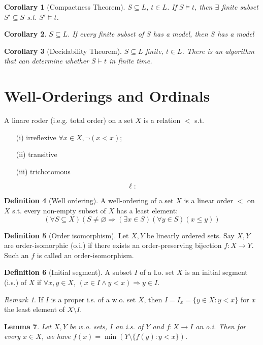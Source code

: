 \documentclass{article}
\theoremstyle{definition}
\newtheorem{defn}{Definition}[section]
\theoremstyle{remark}
\newtheorem{rem}{Remark}
\theoremstyle{plain}
\newtheorem{lem}[defn]{Lemma}
\newtheorem{crly}[defn]{Corollary}
\begin{document}
\begin{crly}[Compactness Theorem]
    $S\subseteq L$, $t\in L$. If $S\vDash t$, then $\exists$ finite subset $S'\subseteq S$ s.t. $S'\vDash t$.
\end{crly}
\begin{crly}
    $S\subseteq L$. If every finite subset of $S$ has a model, then $S$ has a model
\end{crly}
\begin{crly}[Decidability Theorem]
    $S\subseteq L$ finite, $t\in L$. There is an algorithm that can determine whether $S\vdash t$ in finite time.
\end{crly}

\section{Well-Orderings and Ordinals}
A linare roder (i.e.g. total order) on a set $X$ is a relation $<$ s.t.
\begin{enumerate}
    \item[(i)] irreflexive $\forall x\in X, \neg(x<x)$;
    \item[(ii)] transitive
    \item[(iii)] trichotomous
\end{enumerate}
\[\ell:\tag{Owen's signature}\]
\begin{defn}[Well ordering]
    A well-ordering of a set $X$ is a linear order $<$ on $X$ s.t. every non-empty subset of $X$ has a least element:
    \[(\forall S\subseteq X)(S\neq\varnothing\Rightarrow(\exists x\in S)(\forall y\in S)(x\le y))\]
\end{defn}
\begin{defn}[Order isomorphism]
     Let $X, Y$ be linearly ordered sets. Say $X, Y$ are order-isomorphic (o.i.) if there exists an order-preserving bijection $f:X\to Y$. Such an $f$ is called an order-isomorphism.
\end{defn}
\begin{defn}[Initial segment]
    A subset $I$ of a l.o. set $X$ is an initial segment (i.s.) of $X$ if $\forall x, y\in X$, $(x\in I\wedge y<x)\Rightarrow y\in I$.
\end{defn}
\begin{rem}
    If $I$ is a proper i.s.  of a w.o. set $X$, then $I=I_x=\{y\in X:y<x\}$ for $x$ the least element of $X\setminus I$.
\end{rem}
\begin{lem}
    Let $X, Y$ be w.o. sets, $I$ an i.s. of $Y$ and $f:X\to I$ an o.i. Then for every $x\in X$, we have $f(x)=\min(Y\setminus\{f(y):y<x\})$.
\end{lem}
\end{document}
